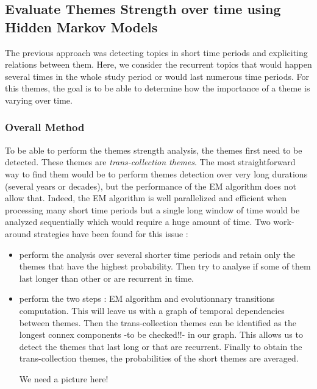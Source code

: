 \subsection{Evaluate Themes Strength over time using Hidden Markov Models}
The previous approach was detecting topics in short time periods and expliciting relations between them. Here, we consider the recurrent topics that would happen several times in the whole study period or would last numerous time periods. For this themes, the goal is to be able to determine how the importance of a theme is varying over time.

\subsubsection{Overall Method}
To be able to perform the themes strength analysis, the themes first need to be detected. These themes are \emph{trans-collection themes}. The most straightforward way to find them would be to perform themes detection over very long durations (several years or decades), but the performance of the EM algorithm does not allow that. Indeed, the EM algorithm is well parallelized and efficient when processing many short time periods but a single long window of time would be analyzed sequentially which would require a huge amount of time. Two work-around strategies have been found for this issue :
\begin{itemize}
\item perform the analysis over several shorter time periods and retain only the themes that have the highest probability. Then try to analyse if some of them last longer than other or are recurrent in time.
\item perform the two steps  : EM algorithm and evolutionnary transitions computation. This will leave us with a graph of temporal dependencies between themes. Then the trans-collection themes can be identified as the longest connex components -to be checked!!- in our graph. This allows us to detect the themes that last long or that are recurrent. Finally to obtain the trans-collection themes, the probabilities of the short themes are averaged.

We need a picture here! 

\end{itemize}

